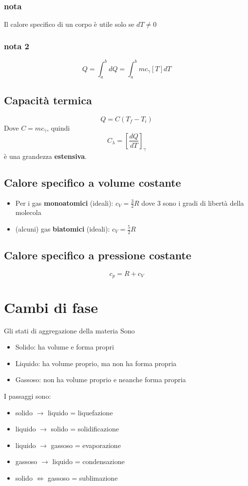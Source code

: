 \documentclass[a4paper]{report}
\begin{document}
  \subsubsection{nota}
  Il calore specifico di un corpo è utile solo se $dT \neq 0$
  \subsubsection{nota 2}
  \[ Q = \int_{a}^b dQ = \int_a^b m c_\gamma[T] dT \]
  \subsection{Capacità termica}
  \[ Q = C(T_f-T_i) \]
  Dove $C = mc_\gamma$, quindi
  \[ C_\lambda = [\frac{dQ}{dT}]_\gamma \]
  è una grandezza \textbf{estensiva}.
  \subsection{Calore specifico a volume costante}
  \begin{itemize}
    \item Per i gas \textbf{monoatomici} (ideali):  $c_V = \frac{3}{2}R$ dove $3$ sono i gradi di libertà della molecola
    \item (alcuni) gas \textbf{biatomici} (ideali):  $c_V = \frac{5}{2}R$
  \end{itemize}
  \subsection{Calore specifico a pressione costante}
  \[ c_p = R + c_V \]

  \section{Cambi di fase}
  Gli stati di aggregazione della materia Sono
  \begin{itemize}
    \item Solido: ha volume e forma propri
    \item Liquido: ha volume proprio, ma non ha forma propria
    \item Gassoso: non ha volume proprio e neanche forma propria
  \end{itemize}
  I passaggi sono:
  \begin{itemize}
    \item solido $\rightarrow$ liquido = liquefazione
    \item liquido $\rightarrow$ solido = solidificazione
    \item liquido $\rightarrow$ gassoso = evaporazione
    \item gassoso $\rightarrow$ liquido = condensazione
    \item solido $\iff$ gassoso = sublimazione
  \end{itemize}
\end{document}
